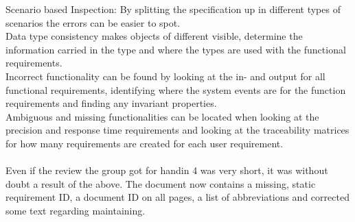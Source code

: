 \documentclass[Main]{subfiles}
\begin{document}
Scenario based Inspection:
By splitting the specification up in different types of scenarios the errors can be easier to spot.
\\
Data type consistency makes objects of different visible, determine the information carried in the type and where the types are used with the functional requirements.
\\
Incorrect functionality can be found by looking at the in- and output for all functional requirements, identifying where the system events are for the function requirements and finding any invariant properties.
\\
Ambiguous and missing functionalities can be located when looking at the precision and response time requirements and looking at the traceability matrices for how many requirements are created for each user requirement.
\\
\\
Even if the review the group got for handin 4 was very short, it was without doubt a result of the above.
The document now contains a missing, static requirement ID, a document ID on all pages, a list of abbreviations and corrected some text regarding maintaining.
\end{document}
